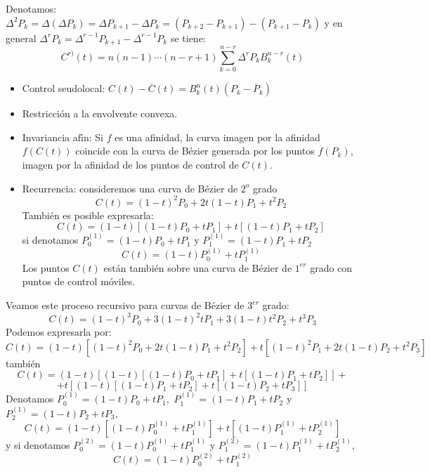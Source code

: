 \documentclass[ebook,oneside]{memoir}
\begin{document}
Denotamos: $\Delta^2 P_k=\Delta(\Delta P_k)=\Delta P_{k+1}-\Delta P_k=(P_{k+2}-P_{k+1})-(P_{k+1}-P_k)$ y en general $\Delta^r P_k=\Delta^{r-1} P_{k+1}-\Delta^{r-1} P_k$ se tiene:
$$C^{r)}(t)=n(n-1)\cdots(n-r+1)\sum_{k=0}^{n-r} \Delta^r P_k B_k^{n-r}(t)$$

\begin{itemize}
\item Control seudolocal: $C(t)-\overline{C}(t)=B_k^n(t) (P_k-\overline{P}_k)$
\item  Restricci\'{o}n a la envolvente convexa. %
\item Invariancia af\'{\i}n: Si $f$ es una afinidad, la curva imagen por la afinidad $f(C(t))$ coincide con la curva de B\'{e}zier generada por los puntos $f(P_k)$, imagen por la afinidad de los puntos de control de $C(t)$.
\item Recurrencia:  consideremos una curva de B\'{e}zier de $2^{o}$ grado
$$C(t)=(1-t)^2 P_0+2t(1-t) P_1+t^2P_2$$
Tambi\'{e}n es posible expresarla:
$$C(t)=(1-t)[(1-t)P_0+tP_1]+t[(1-t)P_1+tP_2]$$
si denotamos $P_0^{(1)}=(1-t)P_0+tP_1$ \;y\; $P_1^{(1)}=(1-t)P_1+tP_2$
$$C(t)=(1-t)P_0^{(1)}+tP_1^{(1)}$$
Los puntos $C(t)$ est\'{a}n tambi\'{e}n sobre una curva de B\'{e}zier de $1^{er}$ grado con puntos de control m\'{o}viles.
\end{itemize}

%

Veamos este proceso recursivo para curvas de B\'{e}zier de $3^{er}$ grado:
$$C(t)=(1-t)^3P_0+3(1-t)^2tP_1+3(1-t)t^2P_2+t^3P_3$$
Podemos expresarla por:
$$C(t)=(1-t)[(1-t)^2P_0+2t(1-t)P_1+t^2P_2]+t[(1-t)^2P_1+2t(1-t)P_2+t^2P_3]$$
tambi\'{e}n
$$C(t)=(1-t)[(1-t)[(1-t)P_0+tP_1]+t[(1-t)P_1+tP_2]]+$$
$$+t[(1-t)[(1-t)P_1+tP_2]+t[(1-t)P_2+tP_3]]$$
Denotamos $P_0^{(1)}=(1-t)P_0+tP_1,$ \; $P_1^{(1)}=(1-t)P_1+tP_2$\; y \;$P_2^{(1)}=(1-t)P_2+tP_3,$
$$C(t)=(1-t)[(1-t)P_0^{(1)}+tP_1^{(1)}]+t[(1-t)P_1^{(1)}+tP_2^{(1)}]$$
y si denotamos $P_0^{(2)}=(1-t)P_0^{(1)}+tP_1^{(1)}$\; y \;$P_1^{(2)}=(1-t)P_1^{(1)}+tP_2^{(1)},$
$$C(t)=(1-t)P_0^{(2)}+tP_1^{(2)}$$
\end{document}
